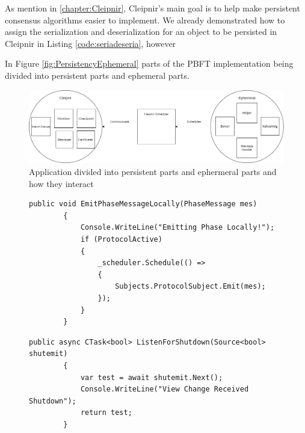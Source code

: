 As mention in \autoref{chapter:Cleipnir}, Cleipnir's main goal is to help make persistent consensus algorithms easier to implement. We already demonstrated how to assign the serialization and deserialization for an object to be persisted in Cleipnir in Listing \autoref{code:seriadeseria}, however 


In Figure \autoref{fig:PersistencyEphemeral} parts of the PBFT implementation being divided into persistent parts and ephemeral parts. 

\begin{figure}[h]
	\includegraphics[width=\linewidth]{figures/CleipnirStructurever1}
	\caption{Application divided into persistent parts and ephermeral parts and how they interact}
	\label{fig:PersistencyEphemeral}
\end{figure}

\begin{figure}[h]
	\centering
	\lstset{style=sharpc}
	\begin{lstlisting}[label = code:schedulerEmit, caption= Example of server and protocol interaction using Cleipnir scheduler, captionpos=b, basicstyle=\scriptsize]
	public void EmitPhaseMessageLocally(PhaseMessage mes)
        {
            Console.WriteLine("Emitting Phase Locally!");
            if (ProtocolActive)
            {
                _scheduler.Schedule(() =>
                {
                    Subjects.ProtocolSubject.Emit(mes);
                });    
            }
        }
	\end{lstlisting}
\end{figure}

\begin{figure}[h]
	\centering
	\lstset{style=sharpc}
	\begin{lstlisting}[label = code:CTaskEx, caption= Example of a CTask function, captionpos = b, basicstyle=\scriptsize]
	public async CTask<bool> ListenForShutdown(Source<bool> shutemit)
        {
            var test = await shutemit.Next();
            Console.WriteLine("View Change Received Shutdown");
            return test;
        }
	\end{lstlisting}
\end{figure}